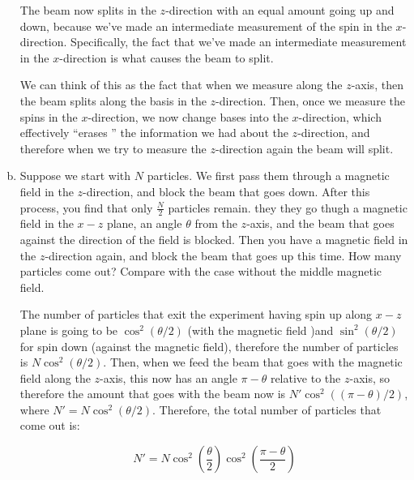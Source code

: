 \documentclass[10pt]{article}
\begin{document}
\begin{enumerate}[(a)]
        \begin{solution}
            The beam now splits in the $z$-direction with an equal amount going up and down, because we've made an intermediate measurement of the spin in the $x$-direction. Specifically, the fact that we've made an intermediate measurement in the $x$-direction is what causes the beam to split. 

            We can think of this as the fact that when we measure along the $z$-axis, then the beam splits along the basis in the $z$-direction. Then, once we measure the spins in the $x$-direction, we now change bases into the $x$-direction, which effectively ``erases
            '' the information we had about the $z$-direction, and therefore when we try to measure the $z$-direction again the beam will split. 
        \end{solution}

        \item Suppose we start with $N$ particles. We first pass them through a magnetic field in the $z$-direction, and block the beam that goes down. After this process, you find that only $\frac{N}{2}$ particles remain. they they go thugh a magnetic field in the $x-z$ plane, an angle $\theta$ from the $z$-axis, and the beam that goes against the direction of the field is blocked. Then you have a magnetic field in the $z$-direction again, and block the beam that goes up this time. How many particles come out? Compare with the case without the middle magnetic field.
        
        \begin{solution}
            The number of particles that exit the experiment having spin up along $x-z$ plane is going to be $\cos^2(\theta/2)$ (with the magnetic field )and $\sin^2(\theta/2)$ for spin down (against the magnetic field), therefore the number of particles is $N \cos^2(\theta/2)$. Then, when we feed the beam that goes with the magnetic field along the $z$-axis, this now has an angle $\pi - \theta$ relative to the $z$-axis, so therefore the amount that goes with the beam now is $N'\cos^2((\pi - \theta)/2)$, where $N' = N \cos^2 (\theta/2)$. Therefore, the total number of particles that come out is: 

            \[ N' = N \cos^2 \left(\frac{\theta}{2}\right) \cos^2\left(\frac{\pi - \theta}{2}\right)\]
        \end{solution}
    \end{enumerate}
\end{document}
